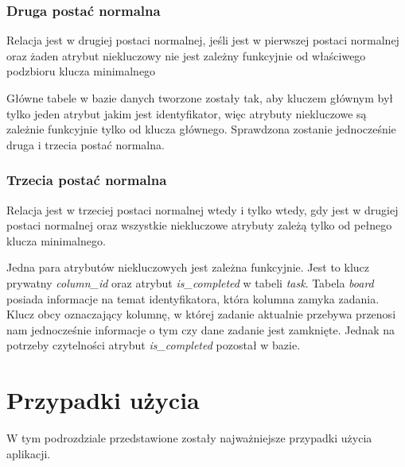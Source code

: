 \subsubsection{Druga  postać normalna}
\begin{definition}
	Relacja jest w drugiej postaci normalnej, jeśli jest w pierwszej postaci normalnej oraz żaden atrybut niekluczowy nie jest zależny funkcyjnie od właściwego podzbioru
	klucza minimalnego
\end{definition}
Główne tabele w bazie danych tworzone zostały tak, aby kluczem głównym był tylko jeden atrybut jakim jest identyfikator, więc atrybuty niekluczowe są zależnie funkcyjnie tylko od klucza głównego. Sprawdzona zostanie jednocześnie druga i trzecia postać normalna.
\subsubsection{Trzecia  postać normalna}
\begin{definition}
	Relacja jest w trzeciej postaci normalnej wtedy i tylko wtedy, gdy jest w drugiej postaci normalnej oraz
	wszystkie niekluczowe atrybuty zależą tylko od pełnego klucza
	minimalnego.
\end{definition}

 Jedna para atrybutów niekluczowych jest zależna funkcyjnie. Jest to klucz prywatny \textit{column\_id} oraz atrybut \textit{is\_completed} w tabeli \textit{task}. Tabela  \textit{board} posiada informacje na temat identyfikatora, która kolumna zamyka zadania. Klucz obcy oznaczający kolumnę, w której zadanie aktualnie przebywa przenosi nam jednocześnie informacje o tym czy dane zadanie jest zamknięte. Jednak na potrzeby czytelności atrybut \textit{is\_completed} pozostał w bazie.
\clearpage
\section{Przypadki użycia}

W tym podrozdziale przedstawione zostały najważniejsze przypadki użycia aplikacji.


